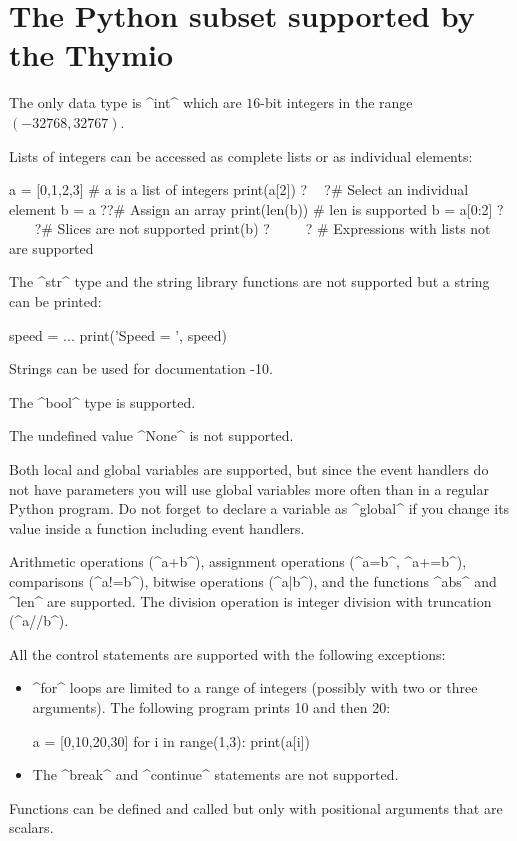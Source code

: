 \documentclass[11pt,a4paper]{article}
\newcommand*{\li}[1]{{\footnotesize\textsf{\ddag #1}}}
\begin{document}

\section{The Python subset supported by the Thymio}\label{s.subset}

The only data type is ^int^ which are $16$-bit integers in the range $(-32768,32767)$.

Lists of integers can be accessed as complete lists or as individual elements:
\begin{prog}
a = [0,1,2,3]  # a is a list of integers
print(a[2])    ?$\quad\:$?# Select an individual element
b = a          ?\hspace{53pt}?# Assign an array
print(len(b))  # len is supported
b = a[0:2]  ?$\quad\;\;\;$?# Slices are not supported
print(b)   ?$\quad\quad\;\;$? # Expressions with lists not are supported
\end{prog}

The ^str^ type and the string library functions are not supported but a string can be printed:
\begin{prog}
speed = ...
print('Speed = ', speed)
\end{prog}
Strings can be used for documentation \li{1-10}.

The ^bool^ type is supported.

The undefined value ^None^ is not supported.

Both local and global variables are supported, but since the event handlers do not have parameters you will use global variables more often than in a regular Python program. Do not forget to declare a variable as ^global^ if you change its value inside a function including event handlers.

Arithmetic operations (^a+b^), assignment operations (^a=b^, ^a+=b^), comparisons (^a!=b^), bitwise operations (^a|b^), and the functions ^abs^ and ^len^ are supported. The division operation is integer division with truncation (^a//b^). 

All the control statements are supported with the following exceptions:
\begin{itemize}
\item ^for^ loops are limited to a range of integers (possibly with two or three arguments). The following program prints 10 and then 20:
\begin{prog}
a = [0,10,20,30]
for i in range(1,3):
    print(a[i])
\end{prog}
\item The ^break^ and ^continue^ statements are not supported.
\end{itemize}
Functions can be defined and called but only with positional arguments that are scalars.
\end{document}

